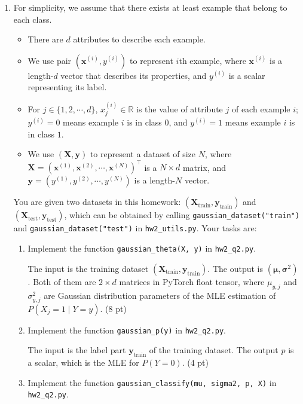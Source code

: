 \documentclass{article}
\newcommand{\bx}{{\boldsymbol x}}
\theoremstyle{definition}
\theoremstyle{remark}
\newenvironment{Q}
        {%
          \clearpage
          \item
        }
        {%
          \phantom{s} %
          \bigskip
        }
\begin{document}
\begin{enumerate}[font={\Large\bfseries},left=0pt]
\begin{Q}
		For simplicity, we assume that there exists at least example that belong to each class.
		\begin{itemize}
			\item There are $d$ attributes to describe each example.
			\item We use pair $(\bm{x}^{(i)},y^{(i)})$ to represent $i$th example, where $\bm{x}^{(i)}$ is a length-$d$ vector that describes its properties, and $y^{(i)}$ is a scalar representing its label.
			\item For $j\in\{1,2,\cdots,d\}$, $x^{(i)}_j\in \mathbb{R}$ is the value of attribute $j$ of each example $i$; $y^{(i)}=0$ means example $i$ is in class $0$, and $y^{(i)}=1$ means example $i$ is in class $1$.
			\item We use $(\bm{X},\bm{y})$ to represent a dataset of size $N$, where $\bm{X}=\left(\bx^{(1)}, \bx^{(2)},\cdots,\bx^{(N)}\right)^\top$ is a $N\times d$ matrix, and $\bm{y}=\left(y^{(1)},y^{(2)},\cdots,y^{(N)}\right)$ is a length-$N$ vector.
		\end{itemize}

		You are given two datasets in this homework: $(\bm{X}_\mathrm{train},\bm{y}_\mathrm{train})$ and $(\bm{X}_\mathrm{test},\bm{y}_\mathrm{test})$, which can be obtained by calling \texttt{gaussian\_dataset("train")} and \texttt{gaussian\_dataset("test")} in \texttt{hw2\_utils.py}. Your tasks are:

		\begin{enumerate}

			\item Implement the function \texttt{gaussian\_theta(X, y)} in \texttt{hw2\_q2.py}.

			      The input is the training dataset $(\bm{X}_\mathrm{train},\bm{y}_\mathrm{train})$. The output is $(\bm{\mu}, \bm{\sigma}^2)$. Both of them are $2\times d$ matrices in PyTorch float tensor, where $\mu_{y,j}$ and $\sigma_{y,j}^2$ are Gaussian distribution parameters of the MLE estimation of $P(X_j=1\mid Y=y)$. (8 pt)


			\item Implement the function \texttt{gaussian\_p(y)} in \texttt{hw2\_q2.py}.

			      The input is the label part $\bm{y}_\mathrm{train}$ of the training dataset. The output $p$ is a scalar, which is the MLE for $P(Y=0)$. (4 pt)

			\item Implement the function \texttt{gaussian\_classify(mu, sigma2, p, X)} in \texttt{hw2\_q2.py}.


\end{enumerate}
\end{Q}
\end{enumerate}
\end{document}
